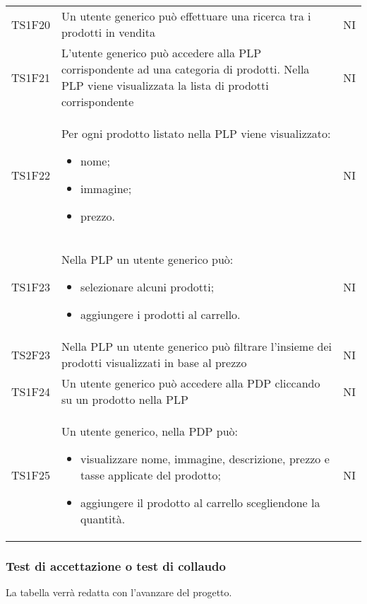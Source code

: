 {\begin{longtable}{C{3cm} C{10.2cm} C{1.5cm}}
TS1F20 & Un utente generico può effettuare una ricerca tra i prodotti in vendita & NI\\

TS1F21 & L'utente generico può accedere alla PLP corrispondente ad una categoria di prodotti. Nella PLP viene visualizzata la lista di prodotti corrispondente & NI\\

TS1F22 & Per ogni prodotto listato nella PLP viene visualizzato:
\begin{itemize}
	\item nome;
	\item immagine;
	\item prezzo.
\end{itemize} & NI\\

TS1F23 & Nella PLP un utente generico può:
\begin{itemize}
	\item selezionare alcuni prodotti;
	\item aggiungere i prodotti al carrello.
\end{itemize} & NI\\

TS2F23 & Nella PLP un utente generico può filtrare l'insieme dei prodotti visualizzati in base al prezzo & NI\\

TS1F24 & Un utente generico può accedere alla PDP cliccando su un prodotto nella PLP & NI\\

TS1F25 & Un utente generico, nella PDP può:
\begin{itemize}
	\item visualizzare nome, immagine, descrizione, prezzo e tasse applicate del prodotto;
	\item aggiungere il prodotto al carrello scegliendone la quantità.
\end{itemize} & NI\\



\end{longtable}


}
\subsubsection{Test di accettazione o test di collaudo}
La tabella verrà redatta con l'avanzare del progetto.